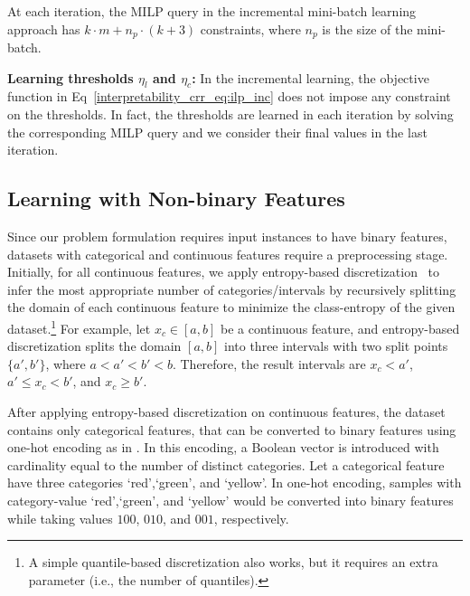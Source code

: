 \begin{proposition}
	At each iteration, the MILP query in the incremental mini-batch learning approach has $ k\cdot m + n_p \cdot (k+3) $  constraints, where $ n_p $  is the size of the mini-batch. 
\end{proposition}

\textbf{Learning thresholds $ \eta_l $ and $ \eta_c $:} In the incremental learning, the objective function in Eq~\ref{interpretability_crr_eq:ilp_inc} does not impose any constraint on the thresholds. In fact, the thresholds are learned in each iteration by solving the corresponding MILP query and we  consider their final values in the last iteration.  





\subsection{Learning with Non-binary Features}
\label{interpretability_crr_sec:discretization}
Since our problem formulation requires input instances to have binary features, datasets with categorical and continuous features  require a preprocessing stage. Initially, for all continuous features, we apply entropy-based discretization~\cite{fayyad1993multi} to infer the most appropriate number of categories/intervals by recursively splitting the domain of each continuous feature to minimize the class-entropy of the given dataset.\footnote{A simple quantile-based discretization also works, but it requires an extra parameter (i.e., the number of quantiles).}  For example, let $ x_c \in [a,b] $ be a continuous feature, and  entropy-based discretization splits the domain $ [a,b] $ into three intervals with two split points $ \{a',b'\} $, where $ a<a'<b'<b $.  Therefore, the result intervals are $ { x_c < a'} $, $ {a' \le x_c < b'} $, and $ { x_c  \ge b'} $.

After applying entropy-based discretization on continuous features,  the dataset  contains only categorical features, that can be converted to binary features using one-hot encoding as in \cite{ghosh19incremental,LKCL2019}. In this encoding, a Boolean vector is introduced with cardinality equal to the number of distinct categories. Let a categorical feature have three  categories `red',`green', and `yellow'. In one-hot encoding, samples with category-value `red',`green', and `yellow' would be converted into binary features while taking values $ 100 $, $ 010 $, and $ 001 $, respectively. 


